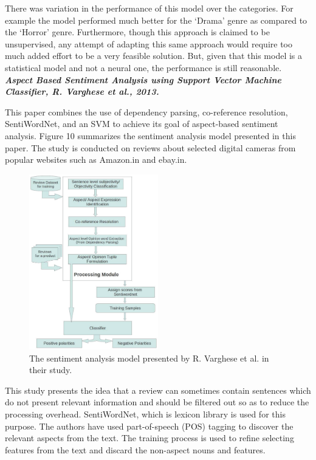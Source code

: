 \documentclass[conference]{IEEEtran}
\begin{document}
There was variation in the performance of this model over the categories. For example the model performed much better for the `Drama' genre as compared to the `Horror' genre. Furthermore, though this approach is claimed to be unsupervised, any attempt of adapting this same approach would require too much added effort to be a very feasible solution. But, given that this model is a statistical model and not a neural one, the performance is still reasonable.\\

\textit{\textbf{Aspect Based Sentiment Analysis using Support Vector Machine Classifier, R. Varghese et al., 2013.}}

This paper combines the use of dependency parsing, co-reference resolution, SentiWordNet, and an SVM to achieve its goal of aspect-based sentiment analysis. Figure 10 summarizes the sentiment analysis model presented in this paper. The study is conducted on reviews about selected digital cameras from popular websites such as Amazon.in and ebay.in.

\begin{figure}[htbp]
\centerline{\includegraphics[keepaspectratio, width=0.5\textwidth]{pics/10.png}}
\caption{The sentiment analysis model presented by R. Varghese et al. in their study.}
\label{fig}
\end{figure}

This study presents the idea that a review can sometimes contain sentences which do not present relevant information and should be filtered out so as to reduce the processing overhead. SentiWordNet, which is lexicon library is used for this purpose. The authors have used part-of-speech (POS) tagging to discover the relevant aspects from the text. The training process is used to refine selecting features from the text and discard the non-aspect nouns and features.
\end{document}
